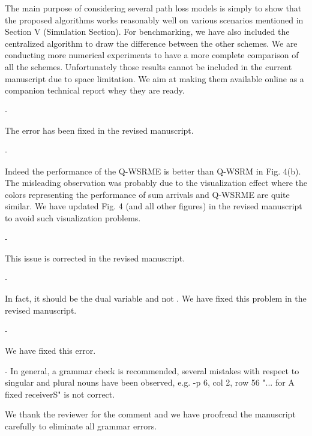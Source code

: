 \begin{enumerate}
\begin{enumerate}
	\resp The main purpose of considering several path loss models is simply to show that the proposed algorithms works reasonably well on various scenarios mentioned in Section V (Simulation Section). For benchmarking, we have also included the centralized algorithm to draw the difference between the other schemes. We are conducting more numerical experiments to have a more complete comparison of all the schemes. Unfortunately those results cannot be included in the current manuscript due to space limitation. We aim at making them available online as a companion technical report whey they are ready.
	
	 - 
	
	\resp The error has been fixed in the revised manuscript.
	
	 - 
	
	\resp Indeed the performance of the Q-WSRME is better than Q-WSRM in Fig. 4(b). The misleading observation was probably due to the visualization effect where the colors representing the performance of sum arrivals and Q-WSRME are quite similar. We have updated Fig. 4 (and all other figures) in the revised manuscript to avoid such visualization problems.
	
	 - 
	
	\resp This issue is corrected in the revised manuscript.
	
	 - 
	
	\resp In fact, it should be the dual variable  and not . We have fixed this problem in the revised manuscript.
	
	 - 	
	
	\resp We have fixed this error.
	
	 - {In general, a grammar check is recommended, several mistakes with respect to singular and plural nouns have been observed, e.g. -p 6, col 2, row 56 "... for A fixed receiverS" is not correct.}
	
	\resp We thank the reviewer for the comment and we have proofread the manuscript carefully to eliminate all grammar errors.
	
\end{enumerate}

\end{enumerate}

